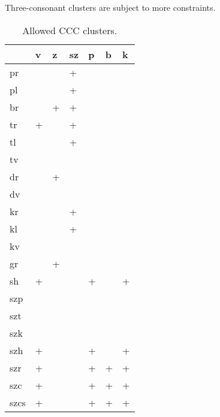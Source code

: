 Three-consonant clusters are subject to more constraints.

\begin{table}
	\small
	\caption{Allowed CCC clusters.}
	\begin{tabu} to 0.6\textwidth {Y[2.0]MMMMMM}
		
		\toprule
		&v&z&sz&p&b&k\\
		\midrule
		pr&&&+&&&\\
		pl&&&+&&&\\
		br&&+&+&&&\\
	
		tr&+&&+&&&\\
		tl&&&+&&&\\
		tv&&&&&&\\
		dr&&+&&&&\\
		dv&&&&&&\\
	
		kr&&&+&&&\\
		kl&&&+&&&\\
		kv&&&&&&\\
		gr&&+&&&&\\
		
		sh&+&&&+&&+\\
		
		szp&&&&&&\\
		szt&&&&&&\\
		szk&&&&&&\\
		szh&+&&&+&&+\\
		szr&+&&&+&+&+\\
		szc&+&&&+&+&+\\
		szcs&+&&&+&+&+\\
		
		\bottomrule
	\end{tabu}
\end{table}

